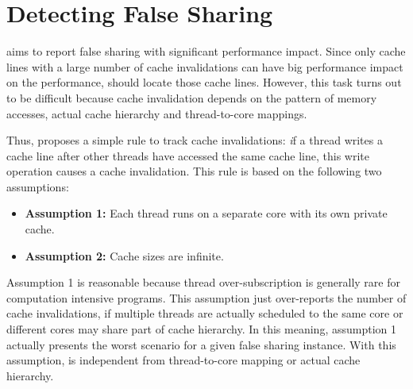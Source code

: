 \section{Detecting False Sharing}
\label{sec:detect}

\cheetah{} aims to report false sharing with significant performance impact. Since only cache lines with a large number of cache invalidations can have big performance impact on the performance, \cheetah{} should locate those cache lines. However, this task turns out to be difficult because cache invalidation depends on the pattern of memory accesses, actual cache hierarchy and thread-to-core mappings. 

Thus, \cheetah{} proposes a simple rule to track cache invalidations: {\emph if a thread writes a cache line after other threads have accessed the same cache line, this write operation causes a cache invalidation}. This rule is based on the following two assumptions:
 

\begin{itemize} 
\item {\bf Assumption 1:} Each thread runs on a separate core with its own private cache. 

\item {\bf Assumption 2: } Cache sizes are infinite. 
 
\end{itemize}

Assumption 1 is reasonable because thread over-subscription is generally rare for computation intensive programs. This assumption just over-reports the number of cache invalidations, if multiple threads are actually scheduled to the same core or different cores may share part of cache hierarchy. In this meaning, assumption 1 actually presents the worst scenario for a given false sharing instance. With this assumption, \cheetah{} is independent from thread-to-core mapping or actual cache hierarchy.

